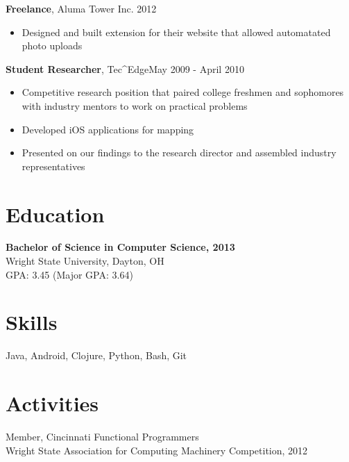 \documentclass[line, margin, 10pt]{res} \setlength{\parskip}{9pt}
\begin{document}
\begin{resume}
  {\bf Freelance}, Aluma Tower Inc. \hfill 2012
  \begin{itemize} \itemsep -2pt %
  \item Designed and built extension for their website that allowed automatated
    photo uploads
  \end{itemize}

  {\bf Student Researcher}, Tec\^{}Edge\hfill May 2009 - April 2010
  \begin{itemize} \itemsep -2pt %
  \item Competitive research position that paired college freshmen and
    sophomores with industry mentors to work on practical problems
  \item Developed iOS applications for mapping
  \item Presented on our findings to the research director and assembled
    industry representatives
  \end{itemize}


  \section{Education}
  {\bf Bachelor of Science in Computer Science, 2013}\\
  Wright State University, Dayton, OH\\
  GPA: 3.45 (Major GPA: 3.64)

\section{Skills}
Java, Android, Clojure, Python, Bash, Git

\section{Activities}
Member, Cincinnati Functional Programmers \\
Wright State Association for Computing Machinery Competition, 2012
  \\
\end{resume}
\end{document}
